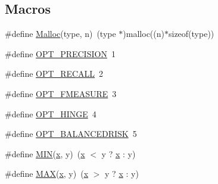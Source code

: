 \subsection*{Macros}
\begin{DoxyCompactItemize}
\item 
\#define \hyperlink{svm-train_8cpp_a9191047fd644a5f519152ecb4aa60357}{Malloc}(type, n)~(type $\ast$)malloc((n)$\ast$sizeof(type))
\item 
\#define \hyperlink{svm-train_8cpp_a3b4c01e0da1a3811cb4a826e9195bded}{O\-P\-T\-\_\-\-P\-R\-E\-C\-I\-S\-I\-O\-N}~1
\item 
\#define \hyperlink{svm-train_8cpp_a8731e6e890928e6058488d8d11ff53de}{O\-P\-T\-\_\-\-R\-E\-C\-A\-L\-L}~2
\item 
\#define \hyperlink{svm-train_8cpp_a565d2328dc3467a90c2181480d9e9cc7}{O\-P\-T\-\_\-\-F\-M\-E\-A\-S\-U\-R\-E}~3
\item 
\#define \hyperlink{svm-train_8cpp_a9e0dc2a94ebfe16c57b1b54d3e011d55}{O\-P\-T\-\_\-\-H\-I\-N\-G\-E}~4
\item 
\#define \hyperlink{svm-train_8cpp_a534c2d1c329720ab36237c4d297a2b20}{O\-P\-T\-\_\-\-B\-A\-L\-A\-N\-C\-E\-D\-R\-I\-S\-K}~5
\item 
\#define \hyperlink{svm-train_8cpp_a74e75242132eaabbc1c512488a135926}{M\-I\-N}(\hyperlink{_2svm-predict_8cpp_a9a5b72a4065074cac5da07efb80a1e79}{x}, y)~(\hyperlink{_2svm-predict_8cpp_a9a5b72a4065074cac5da07efb80a1e79}{x} $<$ y ? \hyperlink{_2svm-predict_8cpp_a9a5b72a4065074cac5da07efb80a1e79}{x} \-: y)
\item 
\#define \hyperlink{svm-train_8cpp_aacc3ee1a7f283f8ef65cea31f4436a95}{M\-A\-X}(\hyperlink{_2svm-predict_8cpp_a9a5b72a4065074cac5da07efb80a1e79}{x}, y)~(\hyperlink{_2svm-predict_8cpp_a9a5b72a4065074cac5da07efb80a1e79}{x} $>$ y ? \hyperlink{_2svm-predict_8cpp_a9a5b72a4065074cac5da07efb80a1e79}{x} \-: y)
\end{DoxyCompactItemize}
